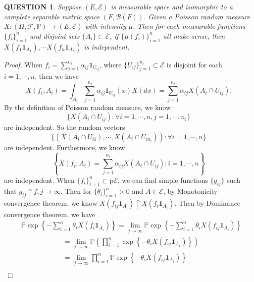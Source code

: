 \documentclass[12pt]{article}
\renewcommand{\b}{\mathscr{B}}
\renewcommand{\i}{\bm{1}}
\renewcommand{\(}{\left(}%
\renewcommand{\)}{\right)}%
\renewcommand{\[}{\left[}%
\renewcommand{\]}{\right]}%
\newcommand{\p}{\mathbb{P}}
\newcommand{\f}{\mathscr{F}}
\newtheorem{question}{QUESTION}[section]}
\newtheorem{proof}{Proof.}}
\begin{document}
  \begin{question}
   Suppose $(E,\mathscr{E})$ is measurable space and isomorphic to a complete separable metric space $(F,\b(F))$. Given a Poisson random measure $X:(\Omega,\f,\p )\to (E,\mathscr{E})$ with intensity $\mu$. Then for each measurable functions $\{f_i\}_{i=1}^n$ and disjoint sets $\{A_i\}\subset\mathscr{E}$, if $\{\mu(f_i)\}_{i=1}^n$ all make sense, then $X(f_1\i_{A_1}),\cdots X(f_n\i_{A_n}) $ is independent.
  \end{question}
  \begin{proof}
   When $f_i=\sum_{j=1}^{n_i} \alpha_{ij} \i_{U_{ij}}$, where $\{U_{ij}\}_{j=1}^{n_i}\subset\mathscr{E}$ is disjoint for each $i=1,\cdots,n$, then we have
   \begin{equation*}
    X(f_i;A_i)=\int_{A_i}\sum_{j=1}^{n_i} \alpha_{ij}\i_{U_{ij}}(x)X(dx)=\sum_{j=1}^{n_i}\alpha_{ij}X(A_i\cap U_{ij}).
   \end{equation*}
   By the definition of Poisson random measure, we know
   \begin{equation*}
    \{X(A_i\cap U_{ij} ):\forall i=1,\cdots,n,j=1,\cdots,n_i\}
   \end{equation*}
   are independent. So the random vectors
   \begin{equation*}
    \{(X(A_i\cap U_{i1} ),\cdots,X(A_i\cap U_{in_i} )): \forall i=1,\cdots,n\}
   \end{equation*}
   are independent. Furthermore, we know
   \begin{equation*}
    \left\{X(f_i;A_i)=\sum_{j=1}^{n_i}\alpha_{ij}X(A_i\cap U_{ij}):i=1,\cdots,n \right\}
   \end{equation*}
   are independent. When $\{f_i\}_{i=1}^n\subset\mathrm{p}\mathscr{E}$, we can find simple functions $\{g_{ij}\}$ such that $g_{ij}\uparrow f,j\to\infty$. Then for $\{\theta_i\}_{i=1}^n>0$ and $A\in\mathscr{E}$, by {\sffamily Monotonicity convergence theorem}, we know $X(f_{ij}\i_{A_i})\uparrow X(f_i\i_{A_i})$. Then by {\sffamily Dominance convergence theorem}, we have
   \begin{equation*}
    \begin{split}
     &\p\exp \left\{- \sum_{i=1}^n\theta_iX(f_i\i_{A_i})\right\}=\lim_{j\to\infty}\p\exp \left\{- \sum_{i=1}^n\theta_iX(f_{ij}\i_{A_i})\right\}\\
     &\qquad\qquad\qquad = \lim_{j\to\infty}\p\(\prod_{i=1}^n \exp \left\{- \theta_iX(f_{ij}\i_{A_i})\right\}\)\\
     &\qquad\qquad\qquad =  \lim_{j\to\infty}\prod_{i=1}^n\p\exp \left\{- \theta_iX(f_{ij}\i_{A_i})\right\}\\

\end{split}
\end{equation*}
\end{proof}
\end{document}
